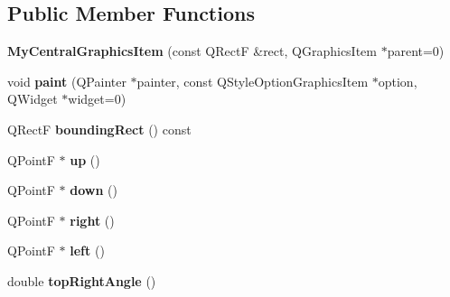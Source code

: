 \subsection*{Public Member Functions}
\begin{DoxyCompactItemize}
\item 
\hypertarget{class_my_central_graphics_item_aad8e57045bd2fa779167b03cc4d904f6}{}{\bfseries My\+Central\+Graphics\+Item} (const Q\+Rect\+F \&rect, Q\+Graphics\+Item $\ast$parent=0)\label{class_my_central_graphics_item_aad8e57045bd2fa779167b03cc4d904f6}

\item 
\hypertarget{class_my_central_graphics_item_a7f7865060c07eb7f53de607b96af4374}{}void {\bfseries paint} (Q\+Painter $\ast$painter, const Q\+Style\+Option\+Graphics\+Item $\ast$option, Q\+Widget $\ast$widget=0)\label{class_my_central_graphics_item_a7f7865060c07eb7f53de607b96af4374}

\item 
\hypertarget{class_my_central_graphics_item_a4b6fb53c59a68427af7b50d87e575b55}{}Q\+Rect\+F {\bfseries bounding\+Rect} () const \label{class_my_central_graphics_item_a4b6fb53c59a68427af7b50d87e575b55}

\item 
\hypertarget{class_my_central_graphics_item_a5cf920e7f80b31b6c1b7584f9b69644a}{}Q\+Point\+F $\ast$ {\bfseries up} ()\label{class_my_central_graphics_item_a5cf920e7f80b31b6c1b7584f9b69644a}

\item 
\hypertarget{class_my_central_graphics_item_a2fb024ca79a6058a3e1b57e8503b07f1}{}Q\+Point\+F $\ast$ {\bfseries down} ()\label{class_my_central_graphics_item_a2fb024ca79a6058a3e1b57e8503b07f1}

\item 
\hypertarget{class_my_central_graphics_item_a464f64aaceac539ed3cd7340ec78be23}{}Q\+Point\+F $\ast$ {\bfseries right} ()\label{class_my_central_graphics_item_a464f64aaceac539ed3cd7340ec78be23}

\item 
\hypertarget{class_my_central_graphics_item_a00cbf493f2486086609589d70cc5ba07}{}Q\+Point\+F $\ast$ {\bfseries left} ()\label{class_my_central_graphics_item_a00cbf493f2486086609589d70cc5ba07}

\item 
\hypertarget{class_my_central_graphics_item_afe51dd4af5f6a9f0d7f9724fd447cf15}{}double {\bfseries top\+Right\+Angle} ()\label{class_my_central_graphics_item_afe51dd4af5f6a9f0d7f9724fd447cf15}


\end{DoxyCompactItemize}
